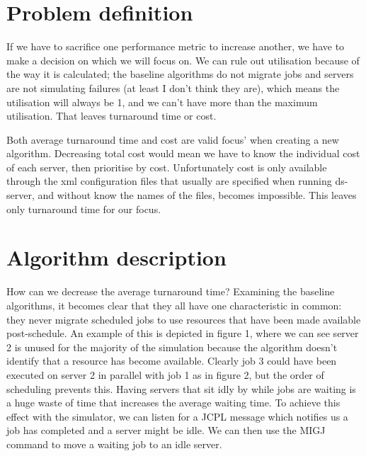 \documentclass[a4paper]{article} %
\begin{document}
\section{Problem definition}
\label{sec:section2}

If we have to sacrifice one performance metric to increase another, we have to make a decision on which we will focus on. We can rule out utilisation because of the way it is calculated; the baseline algorithms do not migrate jobs and servers are not simulating failures (at least I don’t think they are), which means the utilisation will always be 1, and we can’t have more than the maximum utilisation. That leaves turnaround time or cost.\par
Both average turnaround time and cost are valid focus’ when creating a new algorithm. Decreasing total cost would mean we have to know the individual cost of each server, then prioritise by cost. Unfortunately cost is only available through the xml configuration files that usually are specified when running ds-server, and without know the names of the files, becomes impossible. This leaves only turnaround time for our focus. \par



\section{Algorithm description}
How can we decrease the average turnaround time? Examining the baseline algorithms, it becomes clear that they all have one characteristic in common: they never migrate scheduled jobs to use resources that have been made available post-schedule. An example of this is depicted in figure 1, where we can see server 2 is unused for the majority of the simulation because the algorithm doesn’t identify that a resource has become available. Clearly job 3 could have been executed on server 2 in parallel with job 1 as in figure 2, but the order of scheduling prevents this. Having servers that sit idly by while jobs are waiting is a huge waste of time that increases the average waiting time. To achieve this effect with the simulator, we can listen for a JCPL message which notifies us a job has completed and a server might be idle. We can then use the MIGJ command to move a waiting job to an idle server.\par
\end{document}
